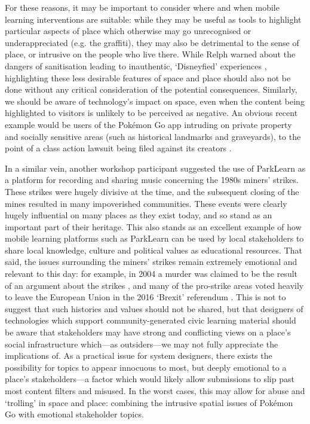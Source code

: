For these reasons, it may be important to consider where and when mobile learning interventions are suitable: while they may be useful as tools to highlight particular aspects of place which otherwise may go unrecognised or underappreciated (e.g. the graffiti), they may also be detrimental to the sense of place, or intrusive on the people who live there. While Relph warned about the dangers of sanitisation leading to inauthentic, `Disneyfied' experiences \citep{Relph2018}, highlighting these less desirable features of space and place should also not be done without any critical consideration of the potential consequences. Similarly, we should be aware of technology's impact on space, even when the content being highlighted to visitors is unlikely to be perceived as negative. An obvious recent example would be users of the Pok\'emon Go app intruding on private property and socially sensitive areas (such as historical landmarks and graveyards), to the point of a class action lawsuit being filed against its creators \citep{Marder2016}.

In a similar vein, another workshop participant suggested the use of ParkLearn as a platform for recording and sharing music concerning the 1980s miners' strikes. These strikes were hugely divisive at the time, and the subsequent closing of the mines resulted in many impoverished communities. These events were clearly hugely influential on many places as they exist today, and so stand as an important part of their heritage. This also stands as an excellent example of how mobile learning platforms such as ParkLearn can be used by local stakeholders to share local knowledge, culture and political values as educational resources. That said, the issues surrounding the miners' strikes remain extremely emotional and relevant to this day: for example, in 2004 a murder was claimed to be the result of an argument about the strikes \citep{theindependent_2004}, and many of the pro-strike areas voted heavily to leave the European Union in the 2016 `Brexit' referendum \citep{dailypost_2017}. This is not to suggest that such histories and values should not be shared, but that designers of technologies which support community-generated civic learning material should be aware that stakeholders may have strong and conflicting views on a place's social infrastructure which---as outsiders---we may not fully appreciate the implications of. As a practical issue for system designers, there exists the possibility for topics to appear innocuous to most, but deeply emotional to a place's stakeholders---a factor which would likely allow submissions to slip past most content filters and misused. In the worst cases, this may allow for abuse and `trolling' in space and place: combining the intrusive spatial issues of Pok\'emon Go with emotional stakeholder topics.

